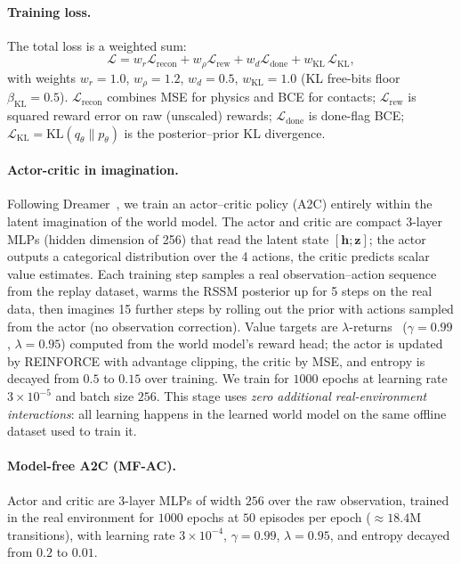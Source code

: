 \documentclass[11pt]{article}
\theoremstyle{remark}
\begin{document}
\paragraph{Training loss.} The total loss is a weighted sum:
\begin{equation}
  \mathcal{L} = w_r \mathcal{L}_{\text{recon}} + w_\rho \mathcal{L}_{\text{rew}}
    + w_d \mathcal{L}_{\text{done}} + w_{\text{KL}} \, \mathcal{L}_{\text{KL}},
  \label{eq:loss}
\end{equation}
with weights $w_r{=}1.0$, $w_\rho{=}1.2$, $w_d{=}0.5$, $w_{\text{KL}}{=}1.0$
(KL free-bits floor $\beta_{\text{KL}}{=}0.5$).
$\mathcal{L}_{\text{recon}}$ combines MSE for physics and BCE for contacts;
$\mathcal{L}_{\text{rew}}$ is squared reward error on raw (unscaled) rewards;
$\mathcal{L}_{\text{done}}$ is done-flag BCE;
$\mathcal{L}_{\text{KL}} = \text{KL}(q_\theta \| p_\theta)$
is the posterior--prior KL divergence.

\paragraph{Actor-critic in imagination.} Following Dreamer~\cite{hafner2020dreamer}, we train an actor--critic policy (A2C) entirely within the latent imagination of the world model. The actor and critic are compact 3-layer MLPs (hidden dimension of 256) that read the latent state $[\bm{h};\bm{z}]$; the actor outputs a categorical distribution over the 4 actions, the critic predicts scalar value estimates. Each training step samples a real observation--action sequence from the replay dataset, warms the RSSM posterior up for 5 steps on the real data, then imagines 15 further steps by rolling out the prior with actions sampled from the actor (no observation correction). Value targets are $\lambda$-returns~\cite{schulman2015gae} ($\gamma{=}0.99$, $\lambda{=}0.95$) computed from the world model's reward head; the actor is updated by REINFORCE with advantage clipping, the critic by MSE, and entropy is decayed from $0.5$ to $0.15$ over training. We train for $1000$ epochs at learning rate $3{\times}10^{-5}$ and batch size $256$. This stage uses \emph{zero additional real-environment interactions}: all learning happens in the learned world model on the same offline dataset used to train it.

\paragraph{Model-free A2C (MF-AC).} Actor and critic are 3-layer MLPs of width $256$ over the raw observation, trained in the real environment for $1000$ epochs at $50$ episodes per epoch ($\approx{18.4\text{M}}$ transitions), with learning rate $3{\times}10^{-4}$, $\gamma{=}0.99$, $\lambda{=}0.95$, and entropy decayed from $0.2$ to $0.01$.
\end{document}
